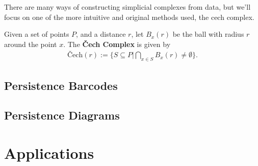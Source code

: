{There are many ways of constructing simplicial complexes from data, but we'll focus on one of the more intuitive and original methods used, the cech complex.

\begin{definition}\label{def:cech-complex}
    Given a set of points \(P\), and a distance \(r\), let \(B_x(r)\) be the ball with radius \(r\) around the point \(x\). The \textbf{\v{C}ech Complex} is given by
		\begin{align*}
            \textrm{\v{C}ech}(r) := \{ S \subseteq P | \bigcap_{x\in S} B_x(r) \neq \emptyset \}
            .
		\end{align*}
		\cite{wagner}
\end{definition}

\subsection{Persistence Barcodes}

\subsection{Persistence Diagrams}

\section{Applications}\label{sec:applications}

}






